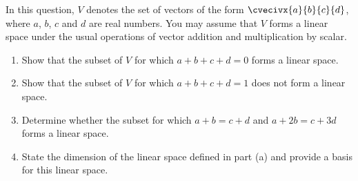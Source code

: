 \begin{problem}
    In this question, $V$ denotes the set of vectors of the form $\cvecivx{a}{b}{c}{d}$, where $a$, $b$, $c$ and $d$ are real numbers. You may assume that $V$ forms a linear space under the usual operations of vector addition and multiplication by scalar.

    \begin{enumerate}
        \item Show that the subset of $V$ for which $a + b + c + d = 0$ forms a linear space.
        \item Show that the subset of $V$ for which $a + b + c + d = 1$ does not form a linear space.
        \item Determine whether the subset for which $a + b = c + d$ and $a + 2b = c + 3d$ forms a linear space.
        \item State the dimension of the linear space defined in part (a) and provide a basis for this linear space.
    \end{enumerate}
\end{problem}
